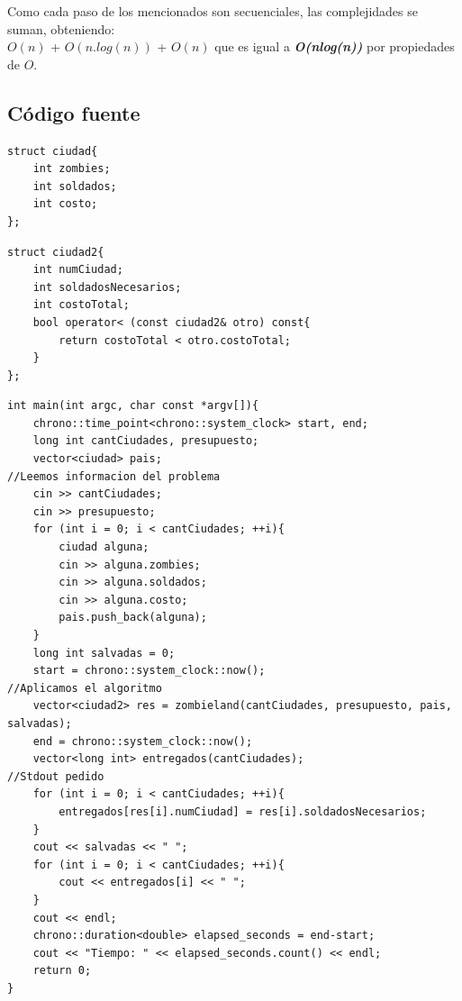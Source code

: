 Como cada paso de los mencionados son secuenciales, las complejidades se suman, obteniendo:\\

$O(n)$ + $O(n.log(n))$ + $O(n)$ 
 que es igual a \textit{\textbf{O(n\*log(n))}} por propiedades de $O$.


\newpage

\subsection{C\'odigo fuente}

	\begin{codesnippet}
	\begin{verbatim}
struct ciudad{
    int zombies;
    int soldados;
    int costo;
};
	\end{verbatim}
	\end{codesnippet}

	\begin{codesnippet}
	\begin{verbatim}
struct ciudad2{
    int numCiudad;
    int soldadosNecesarios;
    int costoTotal;
    bool operator< (const ciudad2& otro) const{
        return costoTotal < otro.costoTotal;
    }
};
	\end{verbatim}
	\end{codesnippet}


	\begin{codesnippet}
	\begin{verbatim}
int main(int argc, char const *argv[]){
    chrono::time_point<chrono::system_clock> start, end;
    long int cantCiudades, presupuesto;
    vector<ciudad> pais;
//Leemos informacion del problema
    cin >> cantCiudades;
    cin >> presupuesto;
    for (int i = 0; i < cantCiudades; ++i){
        ciudad alguna;
        cin >> alguna.zombies;
        cin >> alguna.soldados;
        cin >> alguna.costo;
        pais.push_back(alguna);
    }
    long int salvadas = 0;
    start = chrono::system_clock::now();
//Aplicamos el algoritmo
    vector<ciudad2> res = zombieland(cantCiudades, presupuesto, pais, salvadas);
    end = chrono::system_clock::now();
    vector<long int> entregados(cantCiudades);
//Stdout pedido
    for (int i = 0; i < cantCiudades; ++i){
        entregados[res[i].numCiudad] = res[i].soldadosNecesarios;
    }
    cout << salvadas << " ";
    for (int i = 0; i < cantCiudades; ++i){
        cout << entregados[i] << " ";
    }
    cout << endl;
    chrono::duration<double> elapsed_seconds = end-start;
    cout << "Tiempo: " << elapsed_seconds.count() << endl;
    return 0;
}
	\end{verbatim}
	\end{codesnippet}
	

